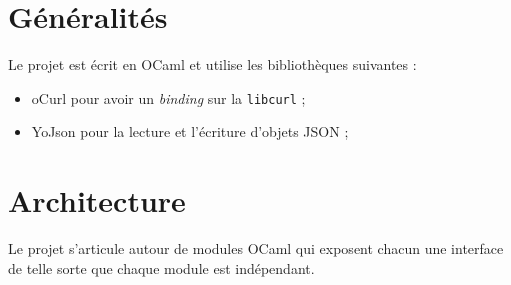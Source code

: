 \documentclass[a4paper, 12pt]{article}
\begin{document}
\section*{Généralités}
Le projet est écrit en OCaml et utilise les bibliothèques suivantes :

\begin{itemize}
\item oCurl pour avoir un \textit{binding} sur la \texttt{libcurl} ;
\item YoJson pour la lecture et l'écriture d'objets JSON ;
\end{itemize}

\section*{Architecture}
Le projet s'articule autour de modules OCaml qui exposent chacun une
interface de telle sorte que chaque module est indépendant.
\end{document}
